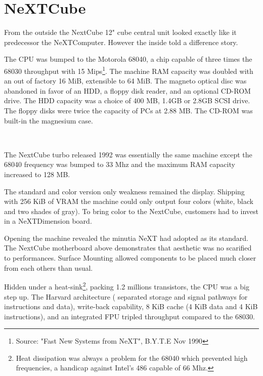 \section{NeXTCube}
From the outside the NextCube 12" cube central unit looked exactly like it predecessor the NeXTComputer. However the inside told a difference story.\\
\par
 The CPU was bumped to the Motorola 68040, a chip capable of three times the 68030 throughput with 15 Mips\footnote{Source: "Fast New Systems from NeXT", B.Y.T.E Nov 1990}. The machine RAM capacity was doubled with an out of factory 16 MiB, extensible to 64 MiB. The magneto optical disc was abandoned in favor of an HDD, a floppy disk reader, and an optional CD-ROM drive. The HDD capacity was a choice of 400 MB, 1.4GB or 2.8GB SCSI drive. The floppy disks were twice the capacity of PCs at 2.88 MB. The CD-ROM was built-in the magnesium case.\\
\par
\begin{minipage}{\textwidth}
 \\
\end{minipage}

\par
The NextCube turbo released 1992 was essentially the same machine except the 68040 frequency was bumped to 33 Mhz and the maximum RAM capacity increased to 128 MB.\\
\par
The standard and color version only weakness remained the display. Shipping with 256 KiB of VRAM the machine could only output four colors (white, black and two shades of gray). To bring color to the NextCube, customers had to invest in a NeXTDimension board.\\
\par

\pagebreak


\par
Opening the machine revealed the minutia NeXT had adopted as its standard. The NextCube motherboard above demonstrates that aesthetic was no scarified to performances. Surface Mounting allowed components to be placed much closer from each others than usual.\\
\par
Hidden under a heat-sink\footnote{Heat dissipation was always a problem for the 68040 which prevented high frequencies, a handicap against Intel's 486 capable of 66 Mhz.}, packing 1.2 millions transistors, the CPU was a big step up. The Harvard architecture ( separated storage and signal pathways for instructions and data), write-back capability, 8 KiB cache (4 KiB data and 4 KiB instructions), and an integrated FPU tripled throughput compared to the 68030.





